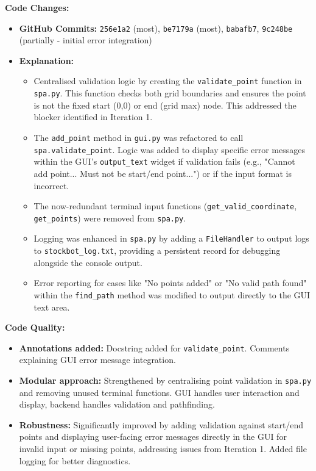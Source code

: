 \textbf{Code Changes:}
\begin{itemize}
	\item \textbf{GitHub Commits:} \verb|256e1a2| (most), \verb|be7179a| (most), \verb|babafb7|, \verb|9c248be| (partially - initial error integration)
	\item \textbf{Explanation:}
	\begin{itemize}
		\item Centralised validation logic by creating the \verb|validate_point| function in \verb|spa.py|. This function checks both grid boundaries and ensures the point is not the fixed start (0,0) or end (grid max) node. This addressed the blocker identified in Iteration 1.
		\item The \verb|add_point| method in \verb|gui.py| was refactored to call \verb|spa.validate_point|. Logic was added to display specific error messages within the GUI's \verb|output_text| widget if validation fails (e.g., "Cannot add point... Must not be start/end point...") or if the input format is incorrect.
		\item The now-redundant terminal input functions (\verb|get_valid_coordinate|, \verb|get_points|) were removed from \verb|spa.py|.
		\item Logging was enhanced in \verb|spa.py| by adding a \verb|FileHandler| to output logs to \verb|stockbot_log.txt|, providing a persistent record for debugging alongside the console output.
		\item Error reporting for cases like "No points added" or "No valid path found" within the \verb|find_path| method was modified to output directly to the GUI text area.
	\end{itemize}
\end{itemize}

\textbf{Code Quality:}
\begin{itemize}
	\item \textbf{Annotations added:} Docstring added for \verb|validate_point|. Comments explaining GUI error message integration.
	\item \textbf{Modular approach:} Strengthened by centralising point validation in \verb|spa.py| and removing unused terminal functions. GUI handles user interaction and display, backend handles validation and pathfinding.
	\item \textbf{Robustness:} Significantly improved by adding validation against start/end points and displaying user-facing error messages directly in the GUI for invalid input or missing points, addressing issues from Iteration 1. Added file logging for better diagnostics.
\end{itemize}

